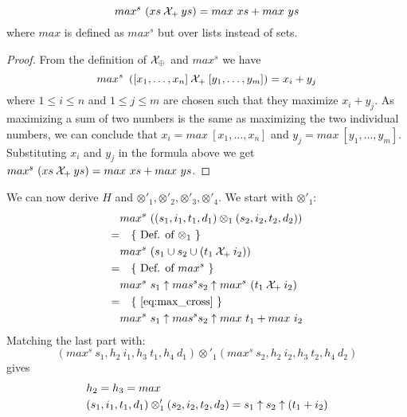 \documentclass{article}
\begin{document}
\begin{equation}\label{eq:max_cross}
    max^s\ (xs \mathbin{\mathcal{X}}_{+} ys) = max\ xs + max\ ys
\end{equation}
where $max$ is defined as $max^s$ but over lists instead of sets.

\begin{proof}
    From the definition of $\mathbin{\mathcal{X}}_{\oplus}$ and $max^s$ we have
    \[
        max^s\ \left(
            [x_1, \ldots, x_n] \mathbin{\mathcal{X}}_{+} [y_1, \ldots, y_m]
        \right) = x_i + y_j
    \]
    where $1 \leq i \leq n$ and $1 \leq j \leq m$ are chosen such that they
    maximize $x_i + y_j$. As maximizing a sum of two numbers is the same as
    maximizing the two individual numbers, we can conclude that
    $x_i = max\ [x_1, \ldots, x_n]$ and $y_j = max\ [y_1, \ldots, y_m]$.
    Substituting $x_i$ and $y_j$ in the formula above we get
    $max^s\ (xs \mathbin{\mathcal{X}}_{+} ys) = max\ xs + max\ ys$.
\end{proof}

We can now derive $H$ and $\otimes'_1 , \otimes'_2 , \otimes'_3 , \otimes'_4$.
We start with $\otimes'_1$:
\begin{align*}
      & max^s\ ((s_1,i_1,t_1,d_1) \otimes_1 (s_2,i_2,t_2,d_2))          \\
    = & \quad \{\ \text{Def. of $\otimes_1$}\ \}                        \\
      & max^s\ (s_1 \cup s_2 \cup (t_1 \crossop_{+} i_2))                \\
    = & \quad \{\ \text{Def. of $max^s$}\ \}                            \\
      & max^s\ s_1 \maxop mas^s s_2 \maxop max^s\ (t_1 \crossop_{+} i_2) \\
    = & \quad \{\ \eqref{eq:max_cross}\ \}                              \\
      & max^s\ s_1 \maxop mas^s s_2 \maxop max\ t_1 + max\ i_2          \\
\end{align*}
Matching the last part with:
\[
    (max^s\ s_1, h_2\ i_1, h_3\ t_1, h_4\ d_1) \otimes'_1
    (max^s\ s_2, h_2\ i_2, h_3\ t_2, h_4\ d_2)
\]
gives
\begin{align*}
    & h_2 = h_3 = max \\
    & (s_1, i_1, t_1, d_1) \otimes'_1
      (s_2, i_2, t_2, d_2)
    = s_1 \uparrow s_2 \uparrow (t_1 + i_2)
\end{align*}
\end{document}
